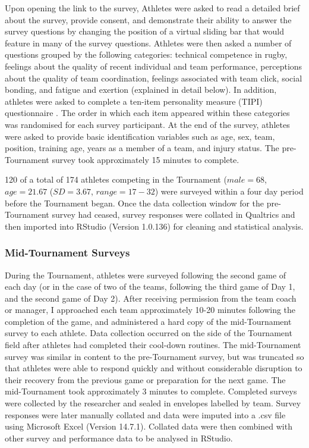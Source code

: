 Upon opening the link to the survey, Athletes were asked to read a detailed brief about the survey, provide consent, and demonstrate their ability to answer the survey questions by changing the position of a virtual sliding bar that would feature in many of the survey questions. Athletes were then asked a number of questions grouped by the following categories: technical competence in rugby, feelings about the quality of recent individual and team performance, perceptions about the quality of team coordination, feelings associated with team click, social bonding, and fatigue and exertion (explained in detail below). In addition, athletes were asked to complete a ten-item personality measure (TIPI) questionnaire  \citep{Gosling2003}. The order in which each item appeared within these categories was randomised for each survey participant. At the end of the survey, athletes were asked to provide basic identification variables such as age, sex, team, position, training age, years as a member of a team, and injury status. The pre-Tournament survey took approximately 15 minutes to complete.

120 of a total of 174 athletes competing in the Tournament ($male = 68$, $age = 21.67$ ($SD = 3.67$, $range = 17-32$) were surveyed within a four day period before the Tournament began. Once the data collection window for the pre-Tournament survey had ceased, survey responses were collated in Qualtrics and then imported into RStudio (Version 1.0.136) for cleaning and statistical analysis. \\


    \subsubsection{Mid-Tournament Surveys}

During the Tournament, athletes were surveyed following the second game of each day (or in the case of two of the teams, following the third game of Day 1, and the second game of Day 2).  After receiving permission from the team coach or manager, I approached each team approximately 10-20 minutes following the completion of the game, and administered a hard copy of the mid-Tournament survey to each athlete.  Data collection occurred on the side of the Tournament field after athletes had completed their cool-down routines. The mid-Tournament survey was similar in content to the pre-Tournament survey, but was  truncated so that athletes were able to respond quickly and without considerable disruption to their recovery from the previous game or preparation for the next game. The mid-Tournament took approximately 3 minutes to complete. Completed surveys were collected by the researcher and sealed in envelopes labelled by team.  Survey responses were later manually collated and data were imputed into a .csv file using Microsoft Excel (Version 14.7.1). Collated data were then combined with other survey and performance data to be analysed in RStudio. \\


